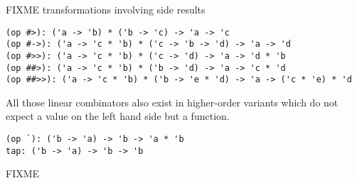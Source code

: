 \begin{isabellebody}
\begin{isamarkuptext}
\begin{mldecls}
  \end{mldecls}%
\end{isamarkuptext}%
\isamarkuptrue%
%
\endisatagmlref
{\isafoldmlref}%
%
\isadelimmlref
%
\endisadelimmlref
%
\begin{isamarkuptext}%
\noindent FIXME transformations involving side results%
\end{isamarkuptext}%
\isamarkuptrue%
%
\isadelimmlref
%
\endisadelimmlref
%
\isatagmlref
%
\begin{isamarkuptext}%
\begin{mldecls}
  \verb|(op #>): ('a -> 'b) * ('b -> 'c) -> 'a -> 'c| \\
  \verb|(op #->): ('a -> 'c * 'b) * ('c -> 'b -> 'd) -> 'a -> 'd| \\
  \verb|(op #>>): ('a -> 'c * 'b) * ('c -> 'd) -> 'a -> 'd * 'b| \\
  \verb|(op ##>): ('a -> 'c * 'b) * ('b -> 'd) -> 'a -> 'c * 'd| \\
  \verb|(op ##>>): ('a -> 'c * 'b) * ('b -> 'e * 'd) -> 'a -> ('c * 'e) * 'd| \\
  \end{mldecls}%
\end{isamarkuptext}%
\isamarkuptrue%
%
\endisatagmlref
{\isafoldmlref}%
%
\isadelimmlref
%
\endisadelimmlref
%
\begin{isamarkuptext}%
\noindent All those linear combinators also exist in higher-order
  variants which do not expect a value on the left hand side
  but a function.%
\end{isamarkuptext}%
\isamarkuptrue%
%
\isadelimmlref
%
\endisadelimmlref
%
\isatagmlref
%
\begin{isamarkuptext}%
\begin{mldecls}
  \verb|(op `): ('b -> 'a) -> 'b -> 'a * 'b| \\
  \verb|tap: ('b -> 'a) -> 'b -> 'b| \\
  \end{mldecls}%
\end{isamarkuptext}%
\isamarkuptrue%
%
\endisatagmlref
{\isafoldmlref}%
%
\isadelimmlref
%
\endisadelimmlref
%
\begin{isamarkuptext}%
\noindent FIXME%
\end{isamarkuptext}%
\isamarkuptrue%
%
\isamarkuptrue%
%
\isadelimmlref
%
\endisadelimmlref
%
\isatagmlref
%
\begin{isamarkuptext}%

\end{isamarkuptext}
\end{isabellebody}
